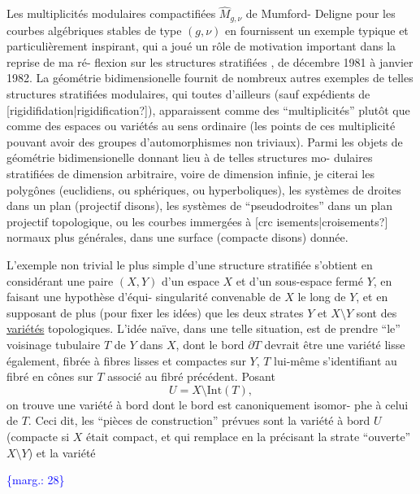 \documentclass[11pt]{article}
\newcommand{\scanpage}[1]{\par\bigskip\noindent{\small\sffamily[scan #1]}\par}
\newcommand{\mspage}[1]{{\small\sffamily[p.\,#1]}}
\newcommand{\margin}[1]{\textcolor{blue}{\{\textsf{marg.:} #1\}}}
\newcommand{\uline}[1]{\underline{#1}}
\newcommand{\unsure}[1]{[#1?]}
\begin{document}
Les multiplicités modulaires compactifiées $\hat{M}_{g,\nu}$ de Mumford-%
Deligne pour les courbes algébriques stables de type $(g,\nu)$ en
fournissent un exemple typique et particulièrement inspirant, qui
a joué un rôle de motivation important dans la reprise de ma ré-%
flexion sur les structures stratifiées , de décembre 1981 à janvier
1982. La géométrie bidimensionelle fournit de nombreux autres
exemples de telles structures stratifiées modulaires, qui toutes
d'ailleurs (sauf expédients de \unsure{rigidifidation|rigidification}), apparaissent
comme des ``multiplicités'' plutôt que comme des espaces ou variétés
au sens ordinaire (les points de ces multiplicité pouvant avoir
des groupes d'automorphismes non triviaux). Parmi les objets de
géométrie bidimensionelle donnant lieu à de telles structures mo-%
dulaires stratifiées de dimension arbitraire, voire de dimension
infinie, je citerai les polygônes (euclidiens, ou sphériques, ou
hyperboliques), les systèmes de droites dans un plan (projectif
disons), les systèmes de ``pseudodroites'' dans un plan projectif
topologique, ou les courbes immergées à \unsure{crc isements|croisements} normaux plus
générales, dans une surface (compacte disons) donnée.

L'exemple non trivial le plus simple d'une structure
stratifiée s'obtient en considérant une paire $(X,Y)$ d'un espace
$X$ et d'un sous-espace fermé $Y$, en faisant une hypothèse d'équi-%
singularité convenable de $X$ le long de $Y$, et en supposant de
plus (pour fixer les idées) que les deux strates $Y$ et $X\setminus Y$ sont
des \uline{variétés} topologiques. L'idée naïve, dans une telle situation,
est de prendre ``le'' voisinage tubulaire $T$ de $Y$ dans $X$, dont
le bord $\partial T$ devrait être une variété lisse également, fibrée à
fibres lisses et compactes sur $Y$, $T$ lui-même s'identifiant au
fibré en cônes sur $T$ associé au fibré précédent. Posant
\[ U = X \setminus \mathrm{Int}(T), \]
on trouve une variété à bord dont le bord est canoniquement isomor-%
phe à celui de $T$. Ceci dit, les ``pièces de construction'' prévues
sont la variété à bord $U$ (compacte si $X$ était compact, et qui
remplace en la précisant la strate ``ouverte'' $X\setminus Y$) et la variété

\margin{28}

\clearpage
\scanpage{119/29}
\mspage{27}
\end{document}
